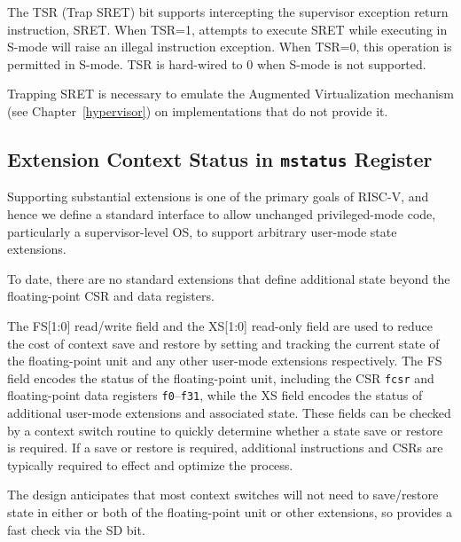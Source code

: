 The TSR (Trap SRET) bit supports intercepting the supervisor exception return
instruction, SRET.  When TSR=1, attempts to execute SRET while executing in
S-mode will raise an illegal instruction exception.  When TSR=0, this
operation is permitted in S-mode.  TSR is hard-wired to 0 when S-mode is not
supported.

\begin{commentary}
Trapping SRET is necessary to emulate the Augmented Virtualization mechanism
(see Chapter~\ref{hypervisor}) on implementations that do not provide it.
\end{commentary}

\subsection{Extension Context Status in {\tt mstatus} Register}

Supporting substantial extensions is one of the primary goals of
RISC-V, and hence we define a standard interface to allow unchanged
privileged-mode code, particularly a supervisor-level OS, to support
arbitrary user-mode state extensions.

\begin{commentary}
  To date, there are no standard extensions that define additional
  state beyond the floating-point CSR and data registers.
\end{commentary}

The FS[1:0] read/write field and the XS[1:0] read-only field are used
to reduce the cost of context save and restore by setting and tracking
the current state of the floating-point unit and any other user-mode
extensions respectively.  The FS field encodes the status of the
floating-point unit, including the CSR {\tt fcsr} and floating-point
data registers {\tt f0}--{\tt f31}, while the XS field encodes the
status of additional user-mode extensions and associated state.
These fields can be checked by a context switch routine to quickly
determine whether a state save or restore is required.  If a save or
restore is required, additional instructions and CSRs are typically
required to effect and optimize the process.

\begin{commentary}
  The design anticipates that most context switches will not need to
  save/restore state in either or both of the floating-point unit or
  other extensions, so provides a fast check via the SD bit.
\end{commentary}

